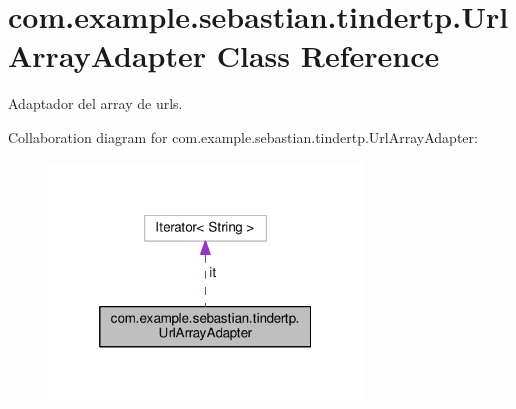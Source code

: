 \hypertarget{classcom_1_1example_1_1sebastian_1_1tindertp_1_1UrlArrayAdapter}{}\section{com.\+example.\+sebastian.\+tindertp.\+Url\+Array\+Adapter Class Reference}
\label{classcom_1_1example_1_1sebastian_1_1tindertp_1_1UrlArrayAdapter}


Adaptador del array de urls.  




Collaboration diagram for com.\+example.\+sebastian.\+tindertp.\+Url\+Array\+Adapter\+:\nopagebreak
\begin{figure}[H]
\begin{center}
\leavevmode
\includegraphics[width=236pt]{classcom_1_1example_1_1sebastian_1_1tindertp_1_1UrlArrayAdapter__coll__graph}
\end{center}
\end{figure}
